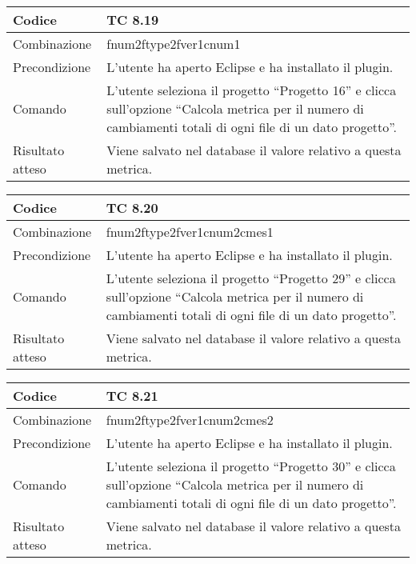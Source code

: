 \begin{table}[ht]
\begin{tabular}{|p{3cm}|p{9cm}|}
\hline
\cellcolor{lightgray}Codice				& TC 8.19								\\
\hline
\cellcolor{lightgray}Combinazione		& fnum2ftype2fver1cnum1									\\
\hline
\cellcolor{lightgray}Precondizione		& L'utente ha aperto Eclipse e ha installato il plugin.		\\
\hline
\cellcolor{lightgray}Comando			& L'utente seleziona il progetto ``Progetto 16''  e clicca sull'opzione ``Calcola metrica per il numero di cambiamenti totali di ogni file di un dato progetto''.	\\
\hline
\cellcolor{lightgray}Risultato atteso	& Viene salvato nel database il valore relativo a questa metrica.\\
\hline
\end{tabular}
\end{table}

\begin{table}[ht]
\begin{tabular}{|p{3cm}|p{9cm}|}
\hline
\cellcolor{lightgray}Codice				& TC 8.20								\\
\hline
\cellcolor{lightgray}Combinazione		& fnum2ftype2fver1cnum2cmes1									\\
\hline
\cellcolor{lightgray}Precondizione		& L'utente ha aperto Eclipse e ha installato il plugin.		\\
\hline
\cellcolor{lightgray}Comando			& L'utente seleziona il progetto ``Progetto 29''  e clicca sull'opzione ``Calcola metrica per il numero di cambiamenti totali di ogni file di un dato progetto''.	\\
\hline
\cellcolor{lightgray}Risultato atteso	& Viene salvato nel database il valore relativo a questa metrica.\\
\hline
\end{tabular}
\end{table}

\begin{table}[ht]
\begin{tabular}{|p{3cm}|p{9cm}|}
\hline
\cellcolor{lightgray}Codice				& TC 8.21								\\
\hline
\cellcolor{lightgray}Combinazione		& fnum2ftype2fver1cnum2cmes2									\\
\hline
\cellcolor{lightgray}Precondizione		& L'utente ha aperto Eclipse e ha installato il plugin.		\\
\hline
\cellcolor{lightgray}Comando			& L'utente seleziona il progetto ``Progetto 30''  e clicca sull'opzione 
``Calcola metrica per il numero di cambiamenti totali di ogni file di un dato progetto''.	\\
\hline
\cellcolor{lightgray}Risultato atteso	& Viene salvato nel database il valore relativo a questa metrica.\\
\hline
\end{tabular}
\end{table}

